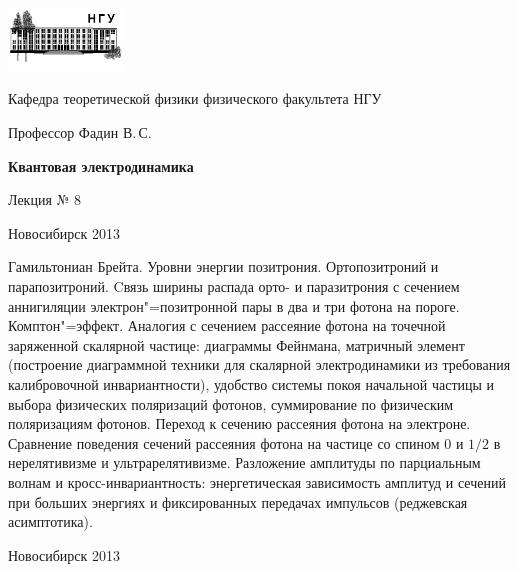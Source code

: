 \documentclass[12pt,pagesize,paper=192mm:108mm]{scrbook}
\begin{document}
\begin{titlepage}
  \vspace*{-1em}
  \begin{center}
    \includegraphics[width=0.23\textwidth]{../NSU-logo}

    Кафедра теоретической физики физического факультета НГУ
    \medskip

    \Large
    Профессор Фадин В.\,С.
    \bigskip

    \huge
    \textbf{Квантовая электродинамика}
    \bigskip

    \Large
    Лекция № 8
    \vfill

    \normalsize
    \vfill

    \normalsize \ccbysa\hspace{0.5em}  Новосибирск 2013
  \end{center}
\end{titlepage}
\vspace*{-1em}
\begin{center}
\vfill
  \begin{minipage}{0.75\linewidth}
    Гамильтониан Брейта. Уровни энергии позитрония. Ортопозитроний и
    парапозитроний. Cвязь ширины распада орто- и паразитрония с
    сечением аннигиляции электрон"=позитронной пары в два и три фотона
    на пороге. Комптон"=эффект. Аналогия с сечением рассеяние фотона на
    точечной заряженной скалярной частице: диаграммы Фейнмана,
    матричный элемент (построение диаграммной техники для скалярной
    электродинамики из требования калибровочной инвариантности),
    удобство системы покоя начальной частицы и выбора физических
    поляризаций фотонов, суммирование по физическим поляризациям
    фотонов.  Переход к сечению рассеяния фотона на
    электроне. Сравнение поведения сечений рассеяния фотона на частице
    со спином 0 и $1/2$ в нерелятивизме и ультрарелятивизме. Разложение
    амплитуды по парциальным волнам и кросс-инвариантность:
    энергетическая зависимость амплитуд и сечений при больших энергиях
    и фиксированных передачах импульсов (реджевская асимптотика).
  \end{minipage}
  \vfill

  \normalsize \ccbysa\hspace{0.5em} Новосибирск 2013
\end{center}
\end{document}
